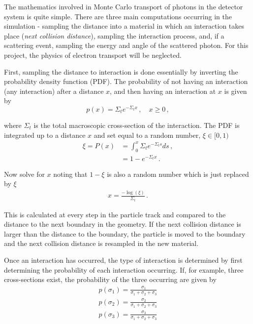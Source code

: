 \documentclass[10pt]{article}
\begin{document}
The mathematics involved in Monte Carlo transport of photons in the detector system is quite simple. There are three main computations occurring in the simulation - sampling the distance into a material in which an interaction takes place (\emph{next collision distance}), sampling the interaction process, and, if a scattering event, sampling the energy and angle of the scattered photon. For this project, the physics of electron transport will be neglected.

First, sampling the distance to interaction is done essentially by inverting the probability density function (PDF). The probability of not having an interaction (any interaction) after a distance $x$, and then having an interaction at $x$ is given by 
%
 \begin{equation}
	p(x) = \Sigma_t e^{-\Sigma_t x}\,, \quad x \geq 0\,,
\end{equation}

\noindent where $\Sigma_t$ is the total macroscopic cross-section of the interaction. The PDF is integrated up to a distance $x$ and set equal to a random number, $\xi \in [0,1)$
%
 \begin{align}
	\xi = P(x) &= \int_0^x \Sigma_t e^{-\Sigma_t s} ds \,, \\
	&= 1-e^{-\Sigma_t x} \,.
\end{align}

\noindent Now solve for $x$ noting that $1-\xi$ is also a random number which is just replaced by $\xi$
%
 \begin{align}
	x = \frac{-\log(\xi)}{\Sigma_t} \,.
\end{align}

\noindent This is calculated at every step in the particle track and compared to the distance to the next boundary in the geometry. If the next collision distance is larger than the distance to the boundary, the particle is moved to the boundary and the next collision distance is resampled in the new material.

Once an interaction has occurred, the type of interaction is determined by first determining the probability of each interaction occurring. If, for example, three cross-sections exist, the probability of the three occurring are given by  
%
\begin{align}
	p(\sigma_1) = \frac{\sigma_1}{\sigma_1 + \sigma_2 + \sigma_3} \\
	p(\sigma_2) = \frac{\sigma_2}{\sigma_1 + \sigma_2 + \sigma_3} \\
	p(\sigma_3) = \frac{\sigma_3}{\sigma_1 + \sigma_2 + \sigma_3}
\end{align}
\end{document}
